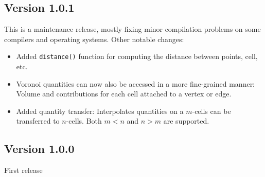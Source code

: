 \subsection*{Version 1.0.1}
This is a maintenance release, mostly fixing minor compilation problems on some compilers and operating systems. Other notable changes:
\begin{itemize}
  \item Added \lstinline|distance()| function for computing the distance between points, cell, etc.
  \item Voronoi quantities can now also be accessed in a more fine-grained manner: Volume and contributions for each cell attached to a vertex or edge.
  \item Added quantity transfer: Interpolates quantities on a $m$-cells can be transferred to $n$-cells. Both $m<n$ and $n>m$ are supported.
\end{itemize}

\subsection*{Version 1.0.0}
First release
